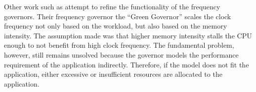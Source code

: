 \documentclass{article}
\begin{document}



Other work such as \cite{Spiliopoulos:11} attempt to refine the functionality of the frequency governors.
Their frequency governor the ``Green Governor'' scales the clock frequency not only based on the workload, but also based on the memory intensity.
The assumption made was that higher memory intensity stalls the CPU enough to not benefit from high clock frequency.
The fundamental problem, however, still remains unsolved because the governor models the performance requirement of the application indirectly.
Therefore, if the model does not fit the application, either excessive or insufficient resources are allocated to the application.\smallskip
\end{document}
